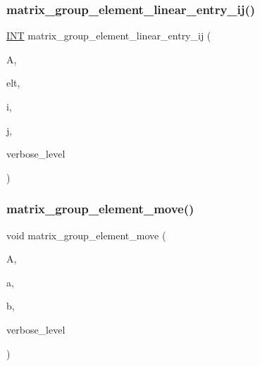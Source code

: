 \subsubsection{\texorpdfstring{matrix\+\_\+group\+\_\+element\+\_\+linear\+\_\+entry\+\_\+ij()}{matrix\_group\_element\_linear\_entry\_ij()}}
{\footnotesize\ttfamily \mbox{\hyperlink{galois_8h_a09fddde158a3a20bd2dcadb609de11dc}{I\+NT}} matrix\+\_\+group\+\_\+element\+\_\+linear\+\_\+entry\+\_\+ij (\begin{DoxyParamCaption}\item[{\mbox{\hyperlink{classaction}{action}} \&}]{A,  }\item[{void $\ast$}]{elt,  }\item[{\mbox{\hyperlink{galois_8h_a09fddde158a3a20bd2dcadb609de11dc}{I\+NT}}}]{i,  }\item[{\mbox{\hyperlink{galois_8h_a09fddde158a3a20bd2dcadb609de11dc}{I\+NT}}}]{j,  }\item[{\mbox{\hyperlink{galois_8h_a09fddde158a3a20bd2dcadb609de11dc}{I\+NT}}}]{verbose\+\_\+level }\end{DoxyParamCaption})}

\mbox{\label{interface__matrix__group_8_c_aee11a8631b44de7c6e8f8883f905d4ba}} 
\subsubsection{\texorpdfstring{matrix\+\_\+group\+\_\+element\+\_\+move()}{matrix\_group\_element\_move()}}
{\footnotesize\ttfamily void matrix\+\_\+group\+\_\+element\+\_\+move (\begin{DoxyParamCaption}\item[{\mbox{\hyperlink{classaction}{action}} \&}]{A,  }\item[{void $\ast$}]{a,  }\item[{void $\ast$}]{b,  }\item[{\mbox{\hyperlink{galois_8h_a09fddde158a3a20bd2dcadb609de11dc}{I\+NT}}}]{verbose\+\_\+level }\end{DoxyParamCaption})}

\mbox{\label{interface__matrix__group_8_c_ad887a3f020f1e4be419c39ae210ef16f}} 
